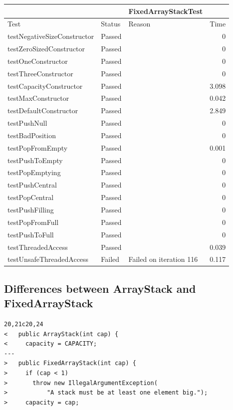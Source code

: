 \documentclass [12pt, a4paper, twoside, titlepage] {article}
\begin{document}
\begin{tabularx}{\textwidth}{lllr}
\hline
 & & \textbf{FixedArrayStackTest} & \\
\hline
Test & Status & Reason & Time \\
\hline 
testNegativeSizeConstructor  & Passed &  &  0\\
testZeroSizedConstructor      & Passed &   &  0 \\
testOneConstructor               & Passed &   &  0 \\
testThreeConstructor  & Passed &  & 0 \\
testCapacityConstructor  & Passed &  & 3.098 \\
testMaxConstructor  & Passed &  &  0.042 \\
testDefaultConstructor  &  Passed &  & 2.849 \\
testPushNull& Passed & & 0\\
testBadPosition  &  Passed &  & 0\\
testPopFromEmpty & Passed & & 0.001\\
testPushToEmpty  &  Passed & & 0\\
testPopEmptying& Passed & & 0\\
testPushCentral  &  Passed &  & 0\\
testPopCentral  & Passed &  & 0\\
testPushFilling  &  Passed &  & 0 \\
testPopFromFull& Passed & & 0 \\
testPushToFull  &  Passed & & 0 \\
testThreadedAccess& Passed & & 0.039 \\
testUnsafeThreadedAccess  & Failed &  Failed on iteration 116 & 0.117\\
\hline 
\end{tabularx}

\subsection{Differences between ArrayStack and FixedArrayStack}



\begin{lstlisting}
20,21c20,24
<   public ArrayStack(int cap) {
<     capacity = CAPACITY;
---
>   public FixedArrayStack(int cap) {
>     if (cap < 1)
>       throw new IllegalArgumentException(
>           "A stack must be at least one element big.");
>     capacity = cap;
\end{lstlisting}
\end{document}
